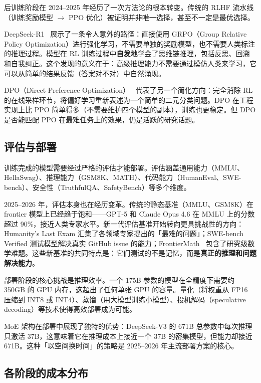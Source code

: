 后训练阶段在 2024--2025 年经历了一次方法论的根本转变。传统的 RLHF 流水线（训练奖励模型 $\to$ PPO 优化）被证明并非唯一选择，甚至不一定是最优选择。

DeepSeek-R1~\cite{deepseekr1} 展示了一条令人意外的路径：直接使用 GRPO（Group Relative Policy Optimization）进行强化学习，不需要单独的奖励模型，也不需要人类标注的推理过程。模型在 RL 训练过程中\textbf{自发地}学会了思维链推理，包括反思、回溯和自我纠正。这个发现的意义在于：高级推理能力不需要通过模仿人类来学习，它可以从简单的结果反馈（答案对不对）中自然涌现。

DPO（Direct Preference Optimization）~\cite{rafailov2023dpo} 代表了另一个简化方向：完全消除 RL 的在线采样环节，将偏好学习重新表述为一个简单的二元分类问题。DPO 在工程实现上比 PPO 简单得多（不需要维护四个模型的副本），训练也更稳定。但 DPO 是否能匹配 PPO 在最难任务上的效果，仍是活跃的研究话题。

\subsection{评估与部署}

训练完成的模型需要经过严格的评估才能部署。评估涵盖通用能力（MMLU、HellaSwag）、推理能力（GSM8K、MATH）、代码能力（HumanEval、SWE-bench）、安全性（TruthfulQA、SafetyBench）等多个维度。

2025--2026 年，评估本身也在经历变革。传统的静态基准（MMLU、GSM8K）在 frontier 模型上已经趋于饱和——GPT-5 和 Claude Opus 4.6 在 MMLU 上的分数超过 90\%，接近人类专家水平。新一代评估基准开始转向更具挑战性的方向：Humanity's Last Exam 汇集了各领域专家提出的「最难的问题」；SWE-bench Verified 测试模型解决真实 GitHub issue 的能力；FrontierMath~\cite{glazer2024frontiermath} 包含了研究级数学难题。这些新基准的共同特点是：它们测试的不是记忆，而是\textbf{真正的推理和问题解决能力}。

部署阶段的核心挑战是推理效率。一个 175B 参数的模型在全精度下需要约 350GB 的 GPU 内存，这超出了任何单张 GPU 的容量。量化（将权重从 FP16 压缩到 INT8 或 INT4）、蒸馏（用大模型训练小模型）、投机解码（speculative decoding）等技术使得高效部署成为可能。

MoE 架构在部署中展现了独特的优势：DeepSeek-V3 的 671B 总参数中每次推理只激活 37B，这意味着它在推理成本上接近一个 37B 的密集模型，但能力却接近 671B。这种「以空间换时间」的策略是 2025--2026 年主流部署方案的核心。

\subsection{各阶段的成本分布}


